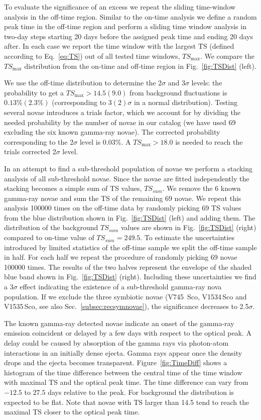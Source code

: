 \documentclass{aa} %
\begin{document}
To evaluate the significance of an excess we repeat the sliding time-window analysis in the off-time region. Similar to the on-time analysis we define a random peak time in the off-time region and perform a sliding time window analysis in two-day steps starting 20 days before the assigned peak time and ending 20 days after. In each case we report the time window with the largest TS (defined according to Eq.~\ref{eq:TS}) out of all tested time windows, $TS_{\textrm{max}}$. We compare the $TS_{\textrm{max}}$ distribution from the on-time and off-time region in Fig.~\ref{fig:TSDist} (left).

We use the off-time distribution to determine the $2\sigma$ and $3\sigma$ levels: the probability to get a $TS_{\textrm{max}} > 14.5 (9.0)$ from background fluctuations is $0.13\% (2.3\%)$ (corresponding to $3 (2)\sigma$ in a normal distribution). Testing several novae introduces a trials factor, which we account for by dividing the needed probability by the number of novae in our catalog (we have used 69 excluding the six known gamma-ray novae). The corrected probability corresponding to the 2$\sigma$ level is 0.03\%. A $TS_{\textrm{max}} > 18.0$ is needed to reach the trials corrected 2$\sigma$ level.

In an attempt to find a sub-threshold population of novae we perform a stacking analysis of all sub-threshold novae. Since the novae are fitted independently the stacking becomes a simple sum of TS values, $TS_{sum}$. We remove the 6 known gamma-ray novae and sum the TS of the remaining 69 novae. We repeat this analysis 100000 times on the off-time data by randomly picking 69 TS values from the blue distribution shown in Fig.~\ref{fig:TSDist} (left) and adding them. The distribution of the background $TS_{sum}$ values are shown in Fig.~\ref{fig:TSDist} (right) compared to on-time value of $TS_{sum} = 249.5$. To estimate the uncertainties introduced by limited statistics of the off-time sample we split the off-time sample in half. For each half we repeat the procedure of randomly picking 69 novae 100000 times. The results of the two halves represent the envelope of the shaded blue band shown in Fig.~\ref{fig:TSDist} (right). Including these uncertainties we find a $3\sigma$ effect indicating the existence of a sub-threshold gamma-ray nova population. If we exclude the three symbiotic novae (V745\, Sco, V1534\,Sco and V1535\,Sco, see also Sec.~\ref{subsec:recsymnovae}), the significance decreases to 2.5$\sigma$.

The known gamma-ray detected novae indicate an onset of the gamma-ray emission coincident or delayed by a few days with respect to the optical peak. A delay could be caused by absorption of the gamma rays via photon-atom interactions in an initially dense ejecta. Gamma rays appear once the density drops and the ejecta becomes transparent. Figure~\ref{fig:TimeDiff} shows a histogram of the time difference between the central time of the time window with maximal TS and the optical peak time. The time difference can vary from $-12.5$ to $27.5$ days relative to the peak. For background the distribution is expected to be flat. Note that novae with TS larger than 14.5 tend to reach the maximal TS closer to the optical peak time.
\end{document}
